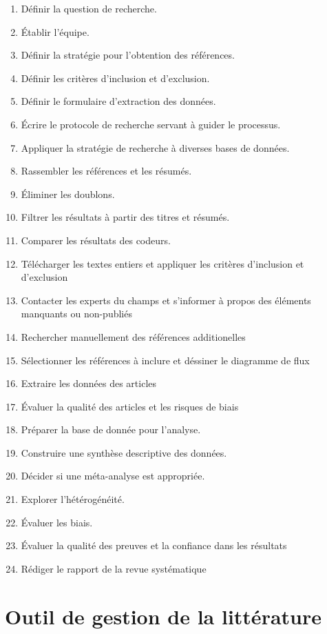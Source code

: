 \documentclass[
  letterpaper,
  DIV=11,
  numbers=noendperiod]{scrreprt}
\providecommand{\tightlist}{%
  \setlength{\itemsep}{0pt}\setlength{\parskip}{0pt}}\usepackage{longtable,booktabs,array}
\begin{document}
\begin{enumerate}
\def\labelenumi{\arabic{enumi}.}
\tightlist
\item
  Définir la question de recherche.
\item
  Établir l'équipe.
\item
  Définir la stratégie pour l'obtention des références.
\item
  Définir les critères d'inclusion et d'exclusion.
\item
  Définir le formulaire d'extraction des données.
\item
  Écrire le protocole de recherche servant à guider le processus.
\item
  Appliquer la stratégie de recherche à diverses bases de données.
\item
  Rassembler les références et les résumés.
\item
  Éliminer les doublons.
\item
  Filtrer les résultats à partir des titres et résumés.
\item
  Comparer les résultats des codeurs.
\item
  Télécharger les textes entiers et appliquer les critères d'inclusion
  et d'exclusion
\item
  Contacter les experts du champs et s'informer à propos des éléments
  manquants ou non-publiés
\item
  Rechercher manuellement des références additionelles
\item
  Sélectionner les références à inclure et déssiner le diagramme de flux
\item
  Extraire les données des articles
\item
  Évaluer la qualité des articles et les risques de biais
\item
  Préparer la base de donnée pour l'analyse.
\item
  Construire une synthèse descriptive des données.
\item
  Décider si une méta-analyse est appropriée.
\item
  Explorer l'hétérogénéité.
\item
  Évaluer les biais.
\item
  Évaluer la qualité des preuves et la confiance dans les résultats
\item
  Rédiger le rapport de la revue systématique
\end{enumerate}

\section{Outil de gestion de la
littérature}\label{outil-de-gestion-de-la-littuxe9rature}
\end{document}
